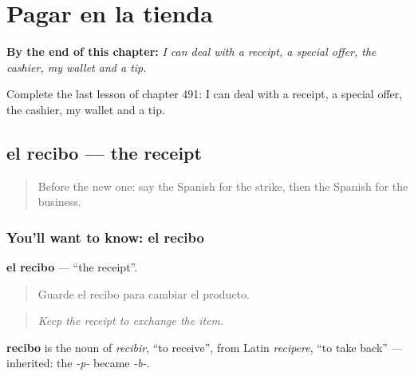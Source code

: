 
\chapter{Pagar en la tienda}
\label{ch:es-pagar-en-la-tienda}

\begin{chapteropening}
\textbf{By the end of this chapter:} \emph{I can deal with a receipt, a special offer, the cashier, my wallet and a tip.}

Complete the last lesson of chapter 491: I can deal with a receipt, a special offer, the cashier, my wallet and a tip.
\end{chapteropening}

\section[el recibo]{el recibo — the receipt}

\label{lesson:ES-C491-recibo}



\begin{quote}
Before the new one: say the Spanish for the strike, then the Spanish for the business.
\end{quote}

\subsection*{You'll want to know: el recibo}
\textbf{el recibo} — \textquotedblleft{}the receipt\textquotedblright{}.

\begin{quote}
Guarde el recibo para cambiar el producto.
\end{quote}

\begin{quote}
\emph{Keep the receipt to exchange the item.}
\end{quote}

\begin{cousinweb}
\textbf{recibo} is the noun of \emph{recibir}, \textquotedblleft{}to receive\textquotedblright{}, from Latin \emph{recipere}, \textquotedblleft{}to take back\textquotedblright{} — inherited: the \emph{-p-} became \emph{-b-}.
\end{cousinweb}

